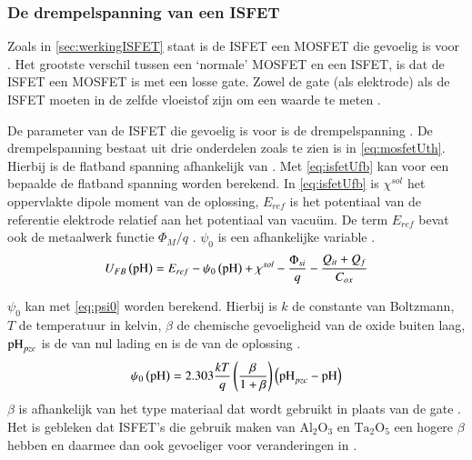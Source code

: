 \subsubsection{De drempelspanning van een ISFET}
Zoals in \cref{sec:werkingISFET} staat is de ISFET een MOSFET die gevoelig is voor \si{\pH} \cite{modeling,isfetAsAnElectronicDevice,bergveld1985impactOfMosfetBasedSensors,bergveld2003thirtyYearsISFET}. Het grootste verschil tussen een `normale' MOSFET en een ISFET, is dat de ISFET een MOSFET is met een losse gate. Zowel de gate (als elektrode) als de ISFET moeten in de zelfde vloeistof zijn om een \si{\pH} waarde te meten \cite{modeling,isfetAsAnElectronicDevice,bergveld1985impactOfMosfetBasedSensors,bergveld2003thirtyYearsISFET}.

De parameter van de ISFET die gevoelig is voor \si{\pH} is de drempelspanning \cite{isfetAsAnElectronicDevice,bergveld2003thirtyYearsISFET,bergveld1985impactOfMosfetBasedSensors}. De drempelspanning bestaat uit drie onderdelen zoals te zien is in \cref{eq:mosfetUth}. Hierbij is de flatband spanning afhankelijk van \si{\pH} \cite{isfetAsAnElectronicDevice,bergveld1985impactOfMosfetBasedSensors,bergveld2003thirtyYearsISFET}. Met \cref{eq:isfetUfb} kan voor een bepaalde \si{\pH} de flatband spanning worden berekend. In \cref{eq:isfetUfb} is $\chi^{sol}$ het oppervlakte dipole moment van de oplossing, $E_{ref}$ is het potentiaal van de referentie elektrode relatief aan het potentiaal van vacuüm. De term $E_{ref}$ bevat ook de metaalwerk functie $\Phi_M/q$ \cite{isfetAsAnElectronicDevice,bergveld2003thirtyYearsISFET,bergveld1985impactOfMosfetBasedSensors}. $\psi_0$ is een \si{\pH} afhankelijke variable \cite{isfetAsAnElectronicDevice,bergveld1985impactOfMosfetBasedSensors,bergveld2003thirtyYearsISFET}.
\begin{equation}\label{eq:isfetUfb}
    U_{FB}\left(\ph\right)=E_{ref}-\psi_0\left(\ph\right)+\chi^{sol}-\frac{\Phi_{si}}{q}-\frac{Q_{it}+Q_f}{C_{ox}}
    \tagaddtext{[\si{\volt}]}
\end{equation}

$\psi_0$ kan met \cref{eq:psi0} worden berekend. Hierbij is $k$ de constante van Boltzmann, $T$ de temperatuur in kelvin, $\beta$ de chemische gevoeligheid van de oxide buiten laag, $\si{\pH}_{pzc}$ is de \si{\pH} van nul lading en \si{\pH} is de \si{\pH} van de oplossing \cite{bergveld2003thirtyYearsISFET,bergveld1985impactOfMosfetBasedSensors}.
\begin{equation}\label{eq:psi0}
    \psi_0\left(\ph\right)=2.303\frac{kT}{q}\left(\frac{\beta}{1+\beta}\right)\left(\ph_{pzc}-\ph\right)
    \tagaddtext{[\si{\volt}]}
\end{equation}
$\beta$ is afhankelijk van het type materiaal dat wordt gebruikt in plaats van de gate \cite{bergveld2003thirtyYearsISFET,bergveld1985impactOfMosfetBasedSensors}. Het is gebleken dat ISFET's die gebruik maken van $\mathrm{Al_{2}O_3}$ en $\mathrm{Ta_2O_5}$ een hogere $\beta$ hebben en daarmee dan ook gevoeliger voor veranderingen in \si{\pH} \cite{bergveld2003thirtyYearsISFET,bergveld1985impactOfMosfetBasedSensors}.

